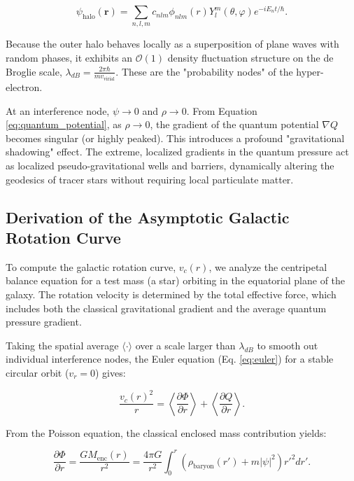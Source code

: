 \begin{equation}
\psi_{\text{halo}}(\mathbf{r}) = \sum_{n,l,m} c_{nlm} \phi_{nlm}(r) Y_l^m(\theta, \varphi) e^{-iE_{n}t/\hbar}.
\end{equation}

Because the outer halo behaves locally as a superposition of plane waves with random phases, it exhibits an $\mathcal{O}(1)$ density fluctuation structure on the de Broglie scale, $\lambda_{dB} = \frac{2\pi\hbar}{mv_{\text{virial}}}$. These are the "probability nodes" of the hyper-electron.

At an interference node, $\psi \to 0$ and $\rho \to 0$. From Equation \ref{eq:quantum_potential}, as $\rho \to 0$, the gradient of the quantum potential $\nabla Q$ becomes singular (or highly peaked). This introduces a profound "gravitational shadowing" effect. The extreme, localized gradients in the quantum pressure act as localized pseudo-gravitational wells and barriers, dynamically altering the geodesics of tracer stars without requiring local particulate matter.

\subsection{Derivation of the Asymptotic Galactic Rotation Curve}

To compute the galactic rotation curve, $v_c(r)$, we analyze the centripetal balance equation for a test mass (a star) orbiting in the equatorial plane of the galaxy. The rotation velocity is determined by the total effective force, which includes both the classical gravitational gradient and the average quantum pressure gradient. 

Taking the spatial average $\langle \cdot \rangle$ over a scale larger than $\lambda_{dB}$ to smooth out individual interference nodes, the Euler equation (Eq. \ref{eq:euler}) for a stable circular orbit ($v_r = 0$) gives:

\begin{equation}
\frac{v_c(r)^2}{r} = \left\langle \frac{\partial \Phi}{\partial r} \right\rangle + \left\langle \frac{\partial Q}{\partial r} \right\rangle.
\end{equation}

From the Poisson equation, the classical enclosed mass contribution yields:

\begin{equation}
\frac{\partial \Phi}{\partial r} = \frac{G M_{\text{enc}}(r)}{r^2} = \frac{4\pi G}{r^2} \int_0^r \left( \rho_{\text{baryon}}(r') + m|\psi|^2 \right) r'^2 dr'.
\end{equation}

